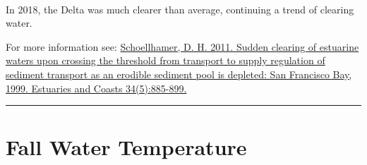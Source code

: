 \documentclass[
]{book}
\begin{document}
\begin{panel-grid}
\begin{columns-nocenter}
\begin{column800}
\end{column800}

\begin{column40}

~

\end{column40}

\begin{column800}

In 2018, the Delta was much clearer than average, continuing a trend of clearing water.

\end{column800}

\end{columns-nocenter}

\end{panel-grid}

\begin{disclaimer}
For more information see:
\href{https://link.springer.com/article/10.1007/s12237-011-9382-x}{Schoellhamer,
D. H. 2011. Sudden clearing of estuarine waters upon crossing the
threshold from transport to supply regulation of sediment transport as
an erodible sediment pool is depleted: San Francisco Bay, 1999.
Estuaries and Coasts 34(5):885-899.}
\end{disclaimer}

\begin{center}\rule{0.5\linewidth}{0.5pt}\end{center}

\hypertarget{fall-water-temperature}{%
\section{Fall Water Temperature}\label{fall-water-temperature}}
\end{document}
